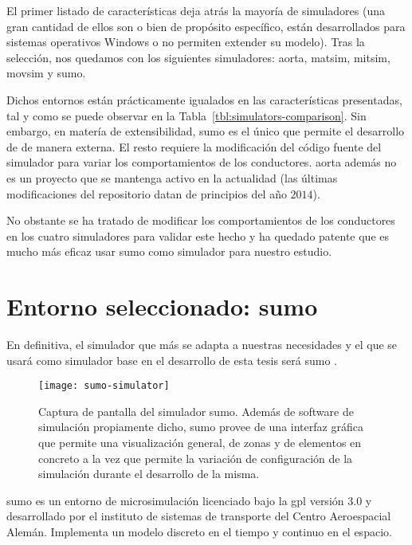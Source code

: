 El primer listado de características deja atrás la mayoría de simuladores (una gran cantidad de ellos son o bien de propósito específico, están desarrollados para sistemas operativos Windows o no permiten extender su modelo). Tras la selección, nos quedamos con los siguientes simuladores: \gls{aorta}, \gls{matsim}, \gls{mitsim}, \gls{movsim} y \gls{sumo}.

Dichos entornos están prácticamente igualados en las características presentadas, tal y como se puede observar en la Tabla~\ref{tbl:simulators-comparison}. Sin embargo, en matería de extensibilidad, \gls{sumo} es el único que permite el desarrollo de  de manera externa. El resto requiere la modificación del código fuente del simulador para variar los comportamientos de los conductores. \gls{aorta} además no es un proyecto que se mantenga activo en la actualidad (las últimas modificaciones del repositorio datan de principios del año $2014$).

No obstante se ha tratado de modificar los comportamientos de los conductores en los cuatro simuladores para validar este hecho y ha quedado patente que es mucho más eficaz usar \gls{sumo} como simulador para nuestro estudio.

\section{Entorno seleccionado: \gls{sumo}}

En definitiva, el simulador que más se adapta a nuestras necesidades y el que se usará como simulador base en el desarrollo de esta tesis será \gls{sumo} \cite{krajzewicz2002sumo, behrisch2011sumo, krajzewicz2012recent}.

\begin{figure}[!b]
	\texttt{[image: sumo-simulator]}
	\caption[Captura de pantalla del simulador \gls{sumo}]{Captura de pantalla del simulador \gls{sumo}. Además de software de simulación propiamente dicho, \gls{sumo} provee de una interfaz gráfica que permite una visualización general, de zonas y de elementos en concreto a la vez que permite la variación de configuración de la simulación durante el desarrollo de la misma.}
	\label{fig:sumo-simulator}
\end{figure}

\gls{sumo} es un entorno de microsimulación licenciado bajo la \gls{gpl} versión $3.0$ y desarrollado por el instituto de sistemas de transporte del Centro Aeroespacial Alemán. Implementa un modelo discreto en el tiempo y continuo en el espacio.

